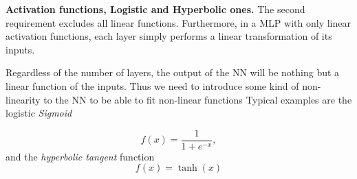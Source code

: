 \documentclass{beamer}
\begin{document}
\begin{frame}

\noindent\textbf{Activation functions, Logistic and Hyperbolic ones.}
The second requirement excludes all linear functions. Furthermore, in
a MLP with only linear activation functions, each layer simply
performs a linear transformation of its inputs.

Regardless of the number of layers, the output of the NN will be
nothing but a linear function of the inputs. Thus we need to introduce
some kind of non-linearity to the NN to be able to fit non-linear
functions Typical examples are the logistic \emph{Sigmoid}

\[
 f(x) = \frac{1}{1 + e^{-x}},
\]
and the \emph{hyperbolic tangent} function
\[
 f(x) = \tanh(x)
\]
\end{frame}
\end{document}
